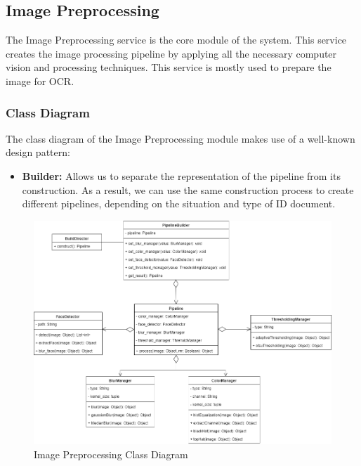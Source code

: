 \documentclass{article}
\begin{document}
\subsection{Image Preprocessing}
The Image Preprocessing service is the core module of the system. This service creates the image processing pipeline by applying all the necessary computer vision and processing techniques. This service is mostly used to prepare the image for OCR. 
\subsubsection{Class Diagram}
The class diagram of the Image Preprocessing module makes use of a well-known design pattern: 
\begin{itemize}
	\item \textbf{Builder:} Allows us to separate the representation of the pipeline from its construction. As a result, we can use the same construction process to create different pipelines, depending on the situation and type of ID document.
\end{itemize}
	\begin{figure}[H]
	    \centering
	    \includegraphics[scale=0.5]{img/imageProcessingClassDiagram.png}
	    \caption{Image Preprocessing Class Diagram}
	 \end{figure}
	 \pagebreak
\end{document}
